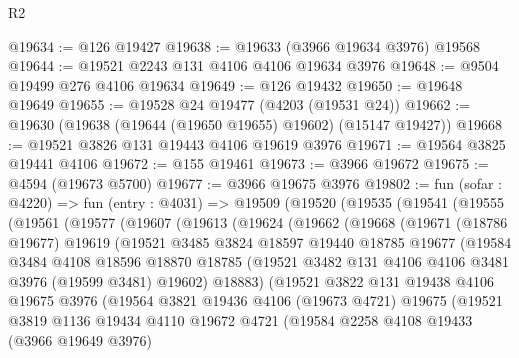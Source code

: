 \begin{lexlean}{R2}
\begin{coremodule}
@19634 := @126 @19427
@19638 := @19633 (@3966 @19634 @3976) @19568
@19644 := @19521 @2243 @131 @4106 @4106 @19634 @3976
@19648 := @9504 @19499 @276 @4106 @19634
@19649 := @126 @19432
@19650 := @19648 @19649
@19655 := @19528 @24 @19477 (@4203 (@19531 @24))
@19662 := @19630 (@19638 (@19644 (@19650 @19655) @19602) (@15147 @19427))
@19668 := @19521 @3826 @131 @19443 @4106 @19619 @3976
@19671 := @19564 @3825 @19441 @4106
@19672 := @155 @19461
@19673 := @3966 @19672
@19675 := @4594 (@19673 @5700)
@19677 := @3966 @19675 @3976
@19802 := fun (sofar : @4220) =>
  fun (entry : @4031) =>
  @19509
    (@19520
      (@19535
        (@19541
          (@19555
            (@19561
              (@19577
                (@19607
                  (@19613
                    (@19624
                      (@19662
                        (@19668
                          (@19671
                            (@18786 @19677)
                            @19619
                            (@19521
                              @3485
                              @3824
                              @18597
                              @19440
                              @18785
                              @19677
                              (@19584
                                @3484
                                @4108
                                @18596
                                @18870
                                @18785
                                (@19521 @3482 @131 @4106 @4106 @3481 @3976 (@19599 @3481) @19602)
                                @18883)
                              (@19521
                                @3822
                                @131
                                @19438
                                @4106
                                @19675
                                @3976
                                (@19564
                                  @3821
                                  @19436
                                  @4106
                                  (@19673 @4721)
                                  @19675
                                  (@19521
                                    @3819
                                    @1136
                                    @19434
                                    @4110
                                    @19672
                                    @4721
                                    (@19584
                                      @2258
                                      @4108
                                      @19433
                                      (@3966 @19649 @3976)

\end{coremodule}
\end{lexlean}
